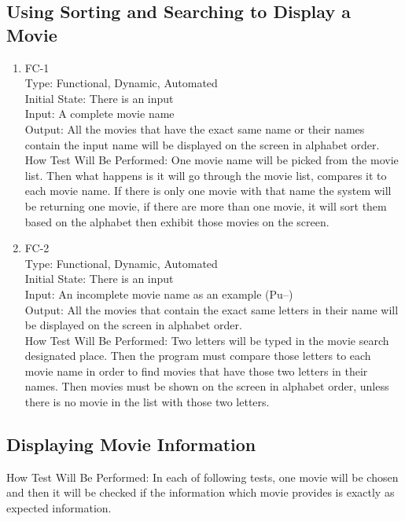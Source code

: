 \documentclass[12pt, titlepage]{article}
\begin{document}
\subsection{Using Sorting and Searching to Display a Movie}
		

\begin{enumerate}

\item{FC-1\\}
Type:  Functional, Dynamic, Automated\\
Initial State: There is an input\\
Input: A complete movie name \\
Output: All the movies that have the exact same name or their names contain the input name will be displayed on the screen in alphabet order.\\
How Test Will Be Performed: One movie name will be picked from the movie list. Then what happens is it will go through the movie list, compares it to each movie name. If there is only one movie with that name the system will be returning one movie, if there are more than one movie, it will sort them based on the alphabet then exhibit those movies on the screen.

					
\item{FC-2\\}
Type:  Functional, Dynamic, Automated\\
Initial State: There is an input\\
Input: An incomplete movie name as an example (Pu--)\\
Output: All the movies that contain the exact same letters in their name will be displayed on the screen in alphabet order.\\
How Test Will Be Performed: Two letters will be typed in the movie search designated place. Then the program must compare those letters to each movie name in order to find movies that have those two letters in their names. Then movies must be shown on the screen in alphabet order, unless there is no movie in the list with those two letters. 

\end{enumerate}

\subsection{Displaying Movie Information}
How Test Will Be Performed: In each of following tests, one movie will be chosen and then it will be checked if the information which movie provides is exactly as expected information.
\end{document}
